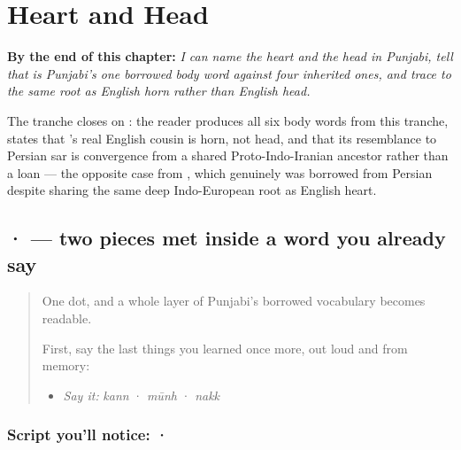 
\chapter{Heart and Head}
\label{ch:pa-heart-and-head}

\begin{chapteropening}
\textbf{By the end of this chapter:} \emph{I can name the heart and the head in Punjabi, tell that  is Punjabi's one borrowed body word against four inherited ones, and trace  to the same root as English horn rather than English head.}

The tranche closes on : the reader produces all six body words from this tranche, states that 's real English cousin is horn, not head, and that its resemblance to Persian sar is convergence from a shared Proto-Indo-Iranian ancestor rather than a loan — the opposite case from , which genuinely was borrowed from Persian despite sharing the same deep Indo-European root as English heart.
\end{chapteropening}

\section[\texorpdfstring{\pa{਼} · \pa{ਸ਼} ((borrowed) · sha)}{਼ · ਸ਼ ((borrowed) · sha)}]{ ·  — two pieces met inside a word you already say}

\label{lesson:PA-S13-pairin-bindi}



\begin{quote}
One dot, and a whole layer of Punjabi's borrowed vocabulary becomes readable.

First, say the last things you learned once more, out loud and from memory:

\begin{itemize}
\raggedright
  \item \emph{Say it:} \emph{kann} · \emph{mūnh} · \emph{nakk}
\end{itemize}
\end{quote}

\subsection*{Script you'll notice:  · }
\begin{quote}
\end{quote}

